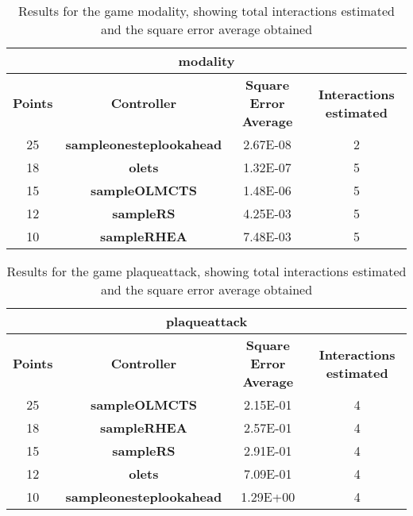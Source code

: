 \begin{table*}[!t]
\begin{center}
\begin{adjustbox}{width=1\textwidth}
\begin{tabular}{|c|c|c|c|}
\hline
\multicolumn{4}{|c|}{\textbf{modality}}\\
\hline
\textbf{Points} & \textbf{Controller} & \textbf{Square Error Average} & \textbf{Interactions estimated}\\
\hline
25 & \textbf{sampleonesteplookahead} & 2.67E-08 & 2
 \\
\hline
18 & \textbf{olets} & 1.32E-07 & 5
 \\
\hline
15 & \textbf{sampleOLMCTS} & 1.48E-06 & 5
 \\
\hline
12 & \textbf{sampleRS} & 4.25E-03 & 5
 \\
\hline
10 & \textbf{sampleRHEA} & 7.48E-03 & 5
 \\
\hline
\end{tabular}
\end{adjustbox}
\caption{Results for the game modality, showing total interactions estimated and the square error average obtained}
\label{tab:weights}
\end{center}
\end{table*}
\begin{table*}[!t]
\begin{center}
\begin{adjustbox}{width=1\textwidth}
\begin{tabular}{|c|c|c|c|}
\hline
\multicolumn{4}{|c|}{\textbf{plaqueattack}}\\
\hline
\textbf{Points} & \textbf{Controller} & \textbf{Square Error Average} & \textbf{Interactions estimated}\\
\hline
25 & \textbf{sampleOLMCTS} & 2.15E-01 & 4
 \\
\hline
18 & \textbf{sampleRHEA} & 2.57E-01 & 4
 \\
\hline
15 & \textbf{sampleRS} & 2.91E-01 & 4
 \\
\hline
12 & \textbf{olets} & 7.09E-01 & 4
 \\
\hline
10 & \textbf{sampleonesteplookahead} & 1.29E+00 & 4
 \\
\hline
\end{tabular}
\end{adjustbox}
\caption{Results for the game plaqueattack, showing total interactions estimated and the square error average obtained}
\label{tab:weights}
\end{center}
\end{table*}
